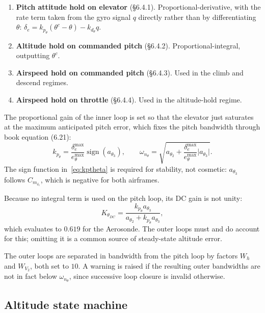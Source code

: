 \documentclass[11pt,a4paper]{article}
\newcommand{\de}{\delta_e}
\begin{document}
\begin{enumerate}
\item \textbf{Pitch attitude hold on elevator} (\S6.4.1). Proportional-derivative,
  with the rate term taken from the gyro signal $q$ directly rather than by
  differentiating $\theta$:
  $\de = k_{p_\theta}(\theta^c - \theta) - k_{d_\theta}q$.
\item \textbf{Altitude hold on commanded pitch} (\S6.4.2). Proportional-integral,
  outputting $\theta^c$.
\item \textbf{Airspeed hold on commanded pitch} (\S6.4.3). Used in the climb and
  descend regimes.
\item \textbf{Airspeed hold on throttle} (\S6.4.4). Used in the altitude-hold
  regime.
\end{enumerate}

The proportional gain of the inner loop is set so that the elevator just saturates
at the maximum anticipated pitch error, which fixes the pitch bandwidth through
book equation (6.21):
\begin{equation}
  k_{p_\theta} = \frac{\de^{\max}}{e_\theta^{\max}}
                 \operatorname{sign}(a_{\theta_3}),
  \qquad
  \omega_{n_\theta} = \sqrt{a_{\theta_2}
      + \frac{\de^{\max}}{e_\theta^{\max}}\lvert a_{\theta_3}\rvert}.
  \label{eq:kptheta}
\end{equation}
The sign function in~\eqref{eq:kptheta} is required for stability, not cosmetic:
$a_{\theta_3}$ follows $C_{m_{\de}}$, which is negative for both airframes.

Because no integral term is used on the pitch loop, its DC gain is not unity:
\begin{equation}
  K_{\theta_{DC}} = \frac{k_{p_\theta}a_{\theta_3}}
                         {a_{\theta_2} + k_{p_\theta}a_{\theta_3}} ,
  \label{eq:KDC}
\end{equation}
which evaluates to $0.619$ for the Aerosonde. The outer loops must and do account
for this; omitting it is a common source of steady-state altitude error.

The outer loops are separated in bandwidth from the pitch loop by factors $W_h$
and $W_{V_2}$, both set to $10$. A warning is raised if the resulting outer
bandwidths are not in fact below $\omega_{n_\theta}$, since successive loop
closure is invalid otherwise.

\subsection{Altitude state machine}
\end{document}
